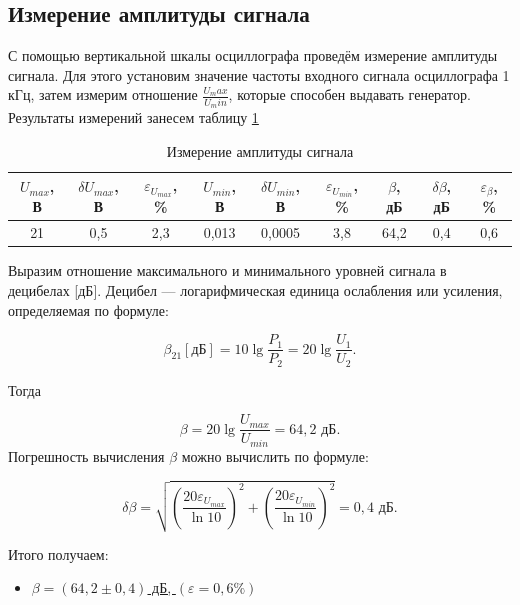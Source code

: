 \documentclass[a4paper,12pt]{article} %
\begin{document}
\subsection{Измерение амплитуды сигнала}

С помощью вертикальной шкалы осциллографа проведём измерение амплитуды сигнала. Для этого установим значение частоты входного сигнала осциллографа 1 кГц, затем измерим отношение $ \frac{U_max}{U_min} $, которые способен выдавать генератор. Результаты измерений занесем  таблицу \ref{tab:my-table}

\begin{table}[H]
	\centering
	\begin{tabular}{|c|c|c|c|c|c|c|c|c|}
		\hline
		$ U_{max} $, В & $ \delta U_{max} $, В & $ \varepsilon_{U_{max}} $, \% & $ U_{min} $, В & $ \delta U_{min} $, В & $ \varepsilon_{U_{min}} $, \% & $ \beta $, дБ & $ \delta\beta $, дБ & $ \varepsilon_\beta $, \% \\ \hline
		21 & 0,5 & 2,3 & 0,013 & 0,0005 & 3,8 & 64,2 & 0,4 & 0,6 \\ \hline
	\end{tabular}
	\caption{Измерение амплитуды сигнала}
	\label{tab:my-table}
\end{table}

Выразим отношение максимального и минимального уровней сигнала в
децибелах [дБ]. Децибел — логарифмическая единица ослабления или
усиления, определяемая по формуле:

\begin{equation}
\beta_{21} \left[\text{дБ}\right]=10\lg\frac{P_1}{P_2}=20\lg\frac{U_1}{U_2}.
\end{equation}

Тогда

\begin{equation}
\beta = 20 \lg \frac{U_{max}}{U_{min}} = 64,2 \text{ дБ}.
\end{equation}
Погрешность вычисления $ \beta $ можно вычислить по формуле:

\begin{equation}
\delta \beta = \sqrt{\left(\frac{20\varepsilon_{U_{max}}}{\ln 10}\right)^2+\left(\frac{20\varepsilon_{U_{min}}}{\ln 10}\right)^2} = 0,4 \text{ дБ}.
\end{equation}

Итого получаем:
\begin{itemize}
	\item \underline{$ \beta = \left(64,2 \pm 0,4\right) $ дБ, $ \left(\varepsilon = 0,6 \%\right) $}
\end{itemize}
\end{document}
